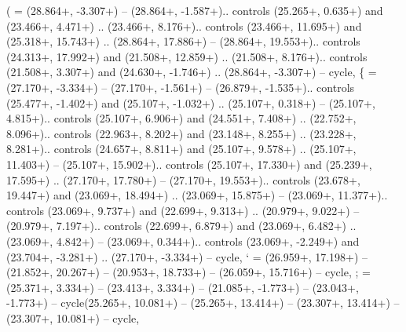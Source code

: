{(} = {(28.864+\ctpXshift, -3.307+\ctpYshift) -- (28.864+\ctpXshift, -1.587+\ctpYshift).. controls (25.265+\ctpXshift, 0.635+\ctpYshift) and (23.466+\ctpXshift, 4.471+\ctpYshift) .. (23.466+\ctpXshift, 8.176+\ctpYshift).. controls (23.466+\ctpXshift, 11.695+\ctpYshift) and (25.318+\ctpXshift, 15.743+\ctpYshift) .. (28.864+\ctpXshift, 17.886+\ctpYshift) -- (28.864+\ctpXshift, 19.553+\ctpYshift).. controls (24.313+\ctpXshift, 17.992+\ctpYshift) and (21.508+\ctpXshift, 12.859+\ctpYshift) .. (21.508+\ctpXshift, 8.176+\ctpYshift).. controls (21.508+\ctpXshift, 3.307+\ctpYshift) and (24.630+\ctpXshift, -1.746+\ctpYshift) .. (28.864+\ctpXshift, -3.307+\ctpYshift) -- cycle},
{\{} = {(27.170+\ctpXshift, -3.334+\ctpYshift) -- (27.170+\ctpXshift, -1.561+\ctpYshift) -- (26.879+\ctpXshift, -1.535+\ctpYshift).. controls (25.477+\ctpXshift, -1.402+\ctpYshift) and (25.107+\ctpXshift, -1.032+\ctpYshift) .. (25.107+\ctpXshift, 0.318+\ctpYshift) -- (25.107+\ctpXshift, 4.815+\ctpYshift).. controls (25.107+\ctpXshift, 6.906+\ctpYshift) and (24.551+\ctpXshift, 7.408+\ctpYshift) .. (22.752+\ctpXshift, 8.096+\ctpYshift).. controls (22.963+\ctpXshift, 8.202+\ctpYshift) and (23.148+\ctpXshift, 8.255+\ctpYshift) .. (23.228+\ctpXshift, 8.281+\ctpYshift).. controls (24.657+\ctpXshift, 8.811+\ctpYshift) and (25.107+\ctpXshift, 9.578+\ctpYshift) .. (25.107+\ctpXshift, 11.403+\ctpYshift) -- (25.107+\ctpXshift, 15.902+\ctpYshift).. controls (25.107+\ctpXshift, 17.330+\ctpYshift) and (25.239+\ctpXshift, 17.595+\ctpYshift) .. (27.170+\ctpXshift, 17.780+\ctpYshift) -- (27.170+\ctpXshift, 19.553+\ctpYshift).. controls (23.678+\ctpXshift, 19.447+\ctpYshift) and (23.069+\ctpXshift, 18.494+\ctpYshift) .. (23.069+\ctpXshift, 15.875+\ctpYshift) -- (23.069+\ctpXshift, 11.377+\ctpYshift).. controls (23.069+\ctpXshift, 9.737+\ctpYshift) and (22.699+\ctpXshift, 9.313+\ctpYshift) .. (20.979+\ctpXshift, 9.022+\ctpYshift) -- (20.979+\ctpXshift, 7.197+\ctpYshift).. controls (22.699+\ctpXshift, 6.879+\ctpYshift) and (23.069+\ctpXshift, 6.482+\ctpYshift) .. (23.069+\ctpXshift, 4.842+\ctpYshift) -- (23.069+\ctpXshift, 0.344+\ctpYshift).. controls (23.069+\ctpXshift, -2.249+\ctpYshift) and (23.704+\ctpXshift, -3.281+\ctpYshift) .. (27.170+\ctpXshift, -3.334+\ctpYshift) -- cycle},
{`} = {(26.959+\ctpXshift, 17.198+\ctpYshift) -- (21.852+\ctpXshift, 20.267+\ctpYshift) -- (20.953+\ctpXshift, 18.733+\ctpYshift) -- (26.059+\ctpXshift, 15.716+\ctpYshift) -- cycle},
{;} = {(25.371+\ctpXshift, 3.334+\ctpYshift) -- (23.413+\ctpXshift, 3.334+\ctpYshift) -- (21.085+\ctpXshift, -1.773+\ctpYshift) -- (23.043+\ctpXshift, -1.773+\ctpYshift) -- cycle(25.265+\ctpXshift, 10.081+\ctpYshift) -- (25.265+\ctpXshift, 13.414+\ctpYshift) -- (23.307+\ctpXshift, 13.414+\ctpYshift) -- (23.307+\ctpXshift, 10.081+\ctpYshift) -- cycle},
